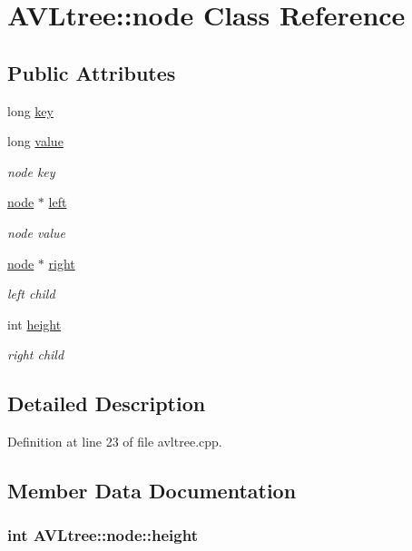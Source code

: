\hypertarget{class_a_v_ltree_1_1node}{\section{A\-V\-Ltree\-:\-:node Class Reference}
\label{class_a_v_ltree_1_1node}
}
\subsection*{Public Attributes}
\begin{DoxyCompactItemize}
\item 
long \hyperlink{class_a_v_ltree_1_1node_af9249c77ccf64046f71f61ec7e9cf3f4}{key}
\item 
long \hyperlink{class_a_v_ltree_1_1node_ad193d6c64cf315f35c953f1e19830a6a}{value}
\begin{DoxyCompactList}\small\item\em node key \end{DoxyCompactList}\item 
\hyperlink{class_a_v_ltree_1_1node}{node} $\ast$ \hyperlink{class_a_v_ltree_1_1node_a619a5dd3401226e2488ce3d4c757f2ba}{left}
\begin{DoxyCompactList}\small\item\em node value \end{DoxyCompactList}\item 
\hyperlink{class_a_v_ltree_1_1node}{node} $\ast$ \hyperlink{class_a_v_ltree_1_1node_ae806bff5f1dbc868ee3a1f6bd5fdf59d}{right}
\begin{DoxyCompactList}\small\item\em left child \end{DoxyCompactList}\item 
int \hyperlink{class_a_v_ltree_1_1node_aa4b4ac2c87a71d0210c728001e9e309c}{height}
\begin{DoxyCompactList}\small\item\em right child \end{DoxyCompactList}\end{DoxyCompactItemize}


\subsection{Detailed Description}


Definition at line 23 of file avltree.\-cpp.



\subsection{Member Data Documentation}
\hypertarget{class_a_v_ltree_1_1node_aa4b4ac2c87a71d0210c728001e9e309c}{
\subsubsection[{height}]{\setlength{\rightskip}{0pt plus 5cm}int A\-V\-Ltree\-::node\-::height}}\label{class_a_v_ltree_1_1node_aa4b4ac2c87a71d0210c728001e9e309c}


